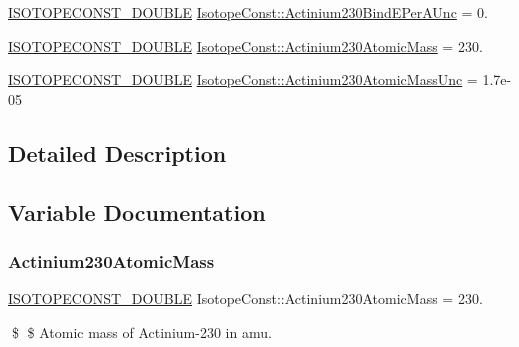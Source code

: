 \begin{DoxyCompactItemize}
\mbox{\hyperlink{group___isotope_const-_macros_ga8f45a7272ce02c0b4c65c44636ed719a}{I\+S\+O\+T\+O\+P\+E\+C\+O\+N\+S\+T\+\_\+\+D\+O\+U\+B\+LE}} \mbox{\hyperlink{group___isotope_const-_actinium-_ac230_ga230064d3941d1e378128f727a6e49661}{Isotope\+Const\+::\+Actinium230\+Bind\+E\+Per\+A\+Unc}} = 0.
\item 
\mbox{\hyperlink{group___isotope_const-_macros_ga8f45a7272ce02c0b4c65c44636ed719a}{I\+S\+O\+T\+O\+P\+E\+C\+O\+N\+S\+T\+\_\+\+D\+O\+U\+B\+LE}} \mbox{\hyperlink{group___isotope_const-_actinium-_ac230_gafe5a3070ac11ac6f51dc744101a81b27}{Isotope\+Const\+::\+Actinium230\+Atomic\+Mass}} = 230.
\item 
\mbox{\hyperlink{group___isotope_const-_macros_ga8f45a7272ce02c0b4c65c44636ed719a}{I\+S\+O\+T\+O\+P\+E\+C\+O\+N\+S\+T\+\_\+\+D\+O\+U\+B\+LE}} \mbox{\hyperlink{group___isotope_const-_actinium-_ac230_gad44068675a3aa7e21cad5f47ada08701}{Isotope\+Const\+::\+Actinium230\+Atomic\+Mass\+Unc}} = 1.\+7e-\/05
\end{DoxyCompactItemize}


\subsection{Detailed Description}


\subsection{Variable Documentation}
\mbox{\label{group___isotope_const-_actinium-_ac230_gafe5a3070ac11ac6f51dc744101a81b27}} 
\subsubsection{\texorpdfstring{Actinium230\+Atomic\+Mass}{Actinium230AtomicMass}}
{\footnotesize\ttfamily \mbox{\hyperlink{group___isotope_const-_macros_ga8f45a7272ce02c0b4c65c44636ed719a}{I\+S\+O\+T\+O\+P\+E\+C\+O\+N\+S\+T\+\_\+\+D\+O\+U\+B\+LE}} Isotope\+Const\+::\+Actinium230\+Atomic\+Mass = 230.}

\$ \$ Atomic mass of Actinium-\/230 in amu. \mbox{\label{group___isotope_const-_actinium-_ac230_gad44068675a3aa7e21cad5f47ada08701}} 

